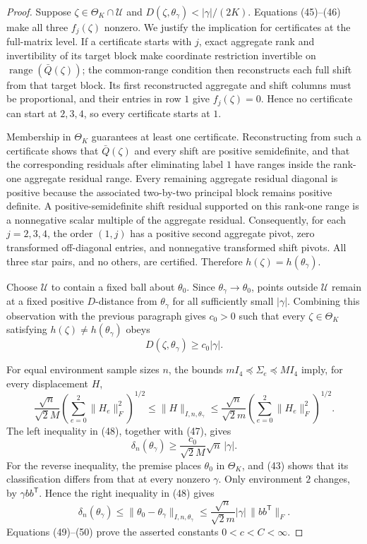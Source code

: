 \documentclass{article}
\begin{document}
\begin{proof}
Suppose \(\zeta\in\Theta_K\cap\mathcal U\) and \(D(\zeta,\theta_\gamma)<|\gamma|/(2K)\).  Equations (45)--(46) make all three \(f_j(\zeta)\) nonzero.  We justify the implication for certificates at the full-matrix level.  If a certificate starts with \(j\), exact aggregate rank and invertibility of its target block make coordinate restriction invertible on \(\operatorname{range}(\bar Q(\zeta))\); the common-range condition then reconstructs each full shift from that target block.  Its first reconstructed aggregate and shift columns must be proportional, and their entries in row \(1\) give \(f_j(\zeta)=0\).  Hence no certificate can start at \(2,3,4\), so every certificate starts at \(1\).

Membership in \(\Theta_K\) guarantees at least one certificate.  Reconstructing from such a certificate shows that \(\bar Q(\zeta)\) and every shift are positive semidefinite, and that the corresponding residuals after eliminating label \(1\) have ranges inside the rank-one aggregate residual range.  Every remaining aggregate residual diagonal is positive because the associated two-by-two principal block remains positive definite.  A positive-semidefinite shift residual supported on this rank-one range is a nonnegative scalar multiple of the aggregate residual.  Consequently, for each \(j=2,3,4\), the order \((1,j)\) has a positive second aggregate pivot, zero transformed off-diagonal entries, and nonnegative transformed shift pivots.  All three star pairs, and no others, are certified.  Therefore \(h(\zeta)=h(\theta_\gamma)\).

Choose \(\mathcal U\) to contain a fixed ball about \(\theta_0\).  Since \(\theta_\gamma\to\theta_0\), points outside \(\mathcal U\) remain at a fixed positive \(D\)-distance from \(\theta_\gamma\) for all sufficiently small \(|\gamma|\).  Combining this observation with the previous paragraph gives \(c_0>0\) such that every \(\zeta\in\Theta_K\) satisfying \(h(\zeta)\ne h(\theta_\gamma)\) obeys
\[
 D(\zeta,\theta_\gamma)\ge c_0|\gamma|. \tag{47}
\]

For equal environment sample sizes \(n\), the bounds \(mI_4\preceq\Sigma_e\preceq MI_4\) imply, for every displacement \(H\),
\[
 \frac{\sqrt n}{\sqrt2M}\left(\sum_{e=0}^2\lVert H_e\rVert_F^2\right)^{1/2}
 \le\lVert H\rVert_{I,n,\theta_\gamma}
 \le\frac{\sqrt n}{\sqrt2m}\left(\sum_{e=0}^2\lVert H_e\rVert_F^2\right)^{1/2}. \tag{48}
\]
The left inequality in (48), together with (47), gives
\[
 \delta_n(\theta_\gamma)\ge\frac{c_0}{\sqrt2M}\sqrt n\,|\gamma|. \tag{49}
\]
For the reverse inequality, the premise places \(\theta_0\) in \(\Theta_K\), and (43) shows that its classification differs from that at every nonzero \(\gamma\).  Only environment \(2\) changes, by \(\gamma bb^{\mathsf T}\).  Hence the right inequality in (48) gives
\[
 \delta_n(\theta_\gamma)
 \le\lVert\theta_0-\theta_\gamma\rVert_{I,n,\theta_\gamma}
 \le\frac{\sqrt n}{\sqrt2m}|\gamma|\,\lVert bb^{\mathsf T}\rVert_F. \tag{50}
\]
Equations (49)--(50) prove the asserted constants \(0<c<C<\infty\).
\end{proof}
\end{document}

